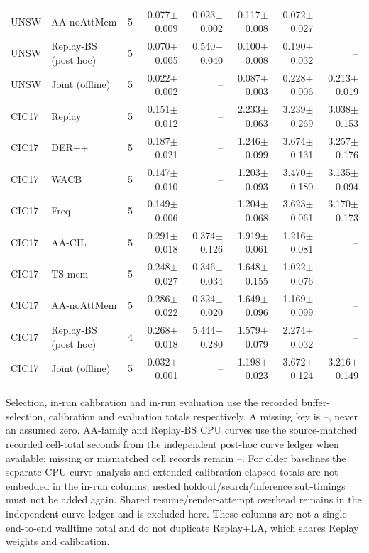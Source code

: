 \begin{table}[t]
\begin{tabular}{llrrrrrr}
UNSW & AA-noAttMem & 5 & 0.077$\pm$0.009 & 0.023$\pm$0.002 & 0.117$\pm$0.008 & 0.072$\pm$0.027 & -- \\
UNSW & Replay-BS (post hoc) & 5 & 0.070$\pm$0.005 & 0.540$\pm$0.040 & 0.100$\pm$0.008 & 0.190$\pm$0.032 & -- \\
UNSW & Joint (offline) & 5 & 0.022$\pm$0.002 & -- & 0.087$\pm$0.003 & 0.228$\pm$0.006 & 0.213$\pm$0.019 \\
CIC17 & Replay & 5 & 0.151$\pm$0.012 & -- & 2.233$\pm$0.063 & 3.239$\pm$0.269 & 3.038$\pm$0.153 \\
CIC17 & DER++ & 5 & 0.187$\pm$0.021 & -- & 1.246$\pm$0.099 & 3.674$\pm$0.131 & 3.257$\pm$0.176 \\
CIC17 & WACB & 5 & 0.147$\pm$0.010 & -- & 1.203$\pm$0.093 & 3.470$\pm$0.180 & 3.135$\pm$0.094 \\
CIC17 & Freq & 5 & 0.149$\pm$0.006 & -- & 1.204$\pm$0.068 & 3.623$\pm$0.061 & 3.170$\pm$0.173 \\
CIC17 & AA-CIL & 5 & 0.291$\pm$0.018 & 0.374$\pm$0.126 & 1.919$\pm$0.061 & 1.216$\pm$0.081 & -- \\
CIC17 & TS-mem & 5 & 0.248$\pm$0.027 & 0.346$\pm$0.034 & 1.648$\pm$0.155 & 1.022$\pm$0.076 & -- \\
CIC17 & AA-noAttMem & 5 & 0.286$\pm$0.022 & 0.324$\pm$0.020 & 1.649$\pm$0.096 & 1.169$\pm$0.099 & -- \\
CIC17 & Replay-BS (post hoc) & 4 & 0.268$\pm$0.018 & 5.444$\pm$0.280 & 1.579$\pm$0.079 & 2.274$\pm$0.032 & -- \\
CIC17 & Joint (offline) & 5 & 0.032$\pm$0.001 & -- & 1.198$\pm$0.023 & 3.672$\pm$0.124 & 3.216$\pm$0.149 \\
\bottomrule
\end{tabular}
\par\vspace{2pt}\begin{minipage}{.98\linewidth}\footnotesize Selection, in-run calibration and in-run evaluation use the recorded buffer-selection, calibration and evaluation totals respectively. A missing key is --, never an assumed zero. AA-family and Replay-BS CPU curves use the source-matched recorded cell-total seconds from the independent post-hoc curve ledger when available; missing or mismatched cell records remain --. For older baselines the separate CPU curve-analysis and extended-calibration elapsed totals are not embedded in the in-run columns; nested holdout/search/inference sub-timings must not be added again. Shared resume/render-attempt overhead remains in the independent curve ledger and is excluded here. These columns are not a single end-to-end walltime total and do not duplicate Replay+LA, which shares Replay weights and calibration.\end{minipage}
\end{table}

